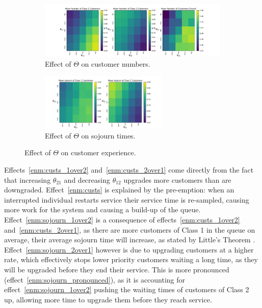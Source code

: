 \documentclass{article}
\begin{document}
\begin{figure}[!htbp]
  \begin{subfigure}[b]{\textwidth}
    \begin{center}
    \includegraphics[width=\textwidth]{img/theta_effect_cust_numbers.pdf}
    \end{center}
    \caption{Effect of $\Theta$ on customer numbers.}
    \label{fig:theta_effect_custs}
  \end{subfigure}
  \begin{subfigure}[b]{\textwidth}
    \begin{center}
    \includegraphics[width=0.666\textwidth]{img/theta_effect_sojourn_times.pdf}
    \end{center}
    \caption{Effect of $\Theta$ on sojourn times.}
    \label{fig:theta_effect_sojourn}
  \end{subfigure}
  \caption{Effect of $\Theta$ on customer experience.}
  \label{fig:theta_effect}
\end{figure}

Effects~\ref{enm:custs_1over2} and~\ref{enm:custs_2over1} come directly from the
fact that increasing $\theta_{21}$ and decreasing $\theta_{12}$ upgrades more
customers than are downgraded. Effect~\ref{enm:custs} is explained by the
pre-emption: when an interrupted individual restarts service their service time
is re-sampled, causing more work for the system and causing a build-up of the
queue.
Effect~\ref{enm:sojourn_1over2} is a consequence of
effects~\ref{enm:custs_1over2} and~\ref{enm:custs_2over1}, as there are more
customers of Class 1 in the queue on average, their average sojourn time will
increase, as stated by Little's Theorem \cite{little61}.
Effect~\ref{enm:sojourn_2over1} however is due to upgrading customers at a
higher rate, which effectively stops lower priority customers waiting a long
time, as they will be upgraded before they end their service.
This is more pronounced (effect~\ref{enm:sojourn_pronounced}), as it is
accounting for effect~\ref{enm:sojourn_1over2} pushing the waiting times of
customers of Class 2 up, allowing more time to upgrade them before they reach
service.
\end{document}
